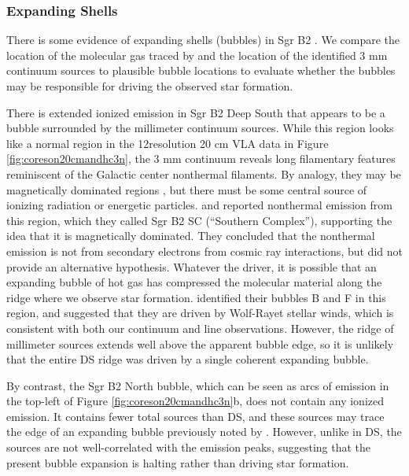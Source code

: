 \documentclass[twocolumn]{aastex61}
\begin{document}
\subsubsection{Expanding Shells}
\label{sec:expandingshells}
There is some evidence of expanding shells (bubbles) in Sgr B2
\citep{de-Vicente1997a,Martin-Pintado1999a}.  We compare the location of the
molecular gas traced by \cyanoacetylene and the location of the identified 3 mm
continuum sources to plausible bubble locations to evaluate whether the bubbles
may be responsible for driving the observed star formation.


There is extended ionized emission in Sgr B2 Deep South that appears to be a
bubble surrounded by the millimeter continuum sources.  While this region looks
like a normal \hii region in the 12\arcsec resolution 20 cm
VLA data in Figure \ref{fig:coreson20cmandhc3n}, the 3 mm continuum reveals long
filamentary features reminiscent of the Galactic center nonthermal filaments.  By
analogy, they may be magnetically dominated regions
\citep[e.g.,][]{LaRosa2004a}, but there must be some
central source of ionizing radiation or energetic particles.
\citet{Jones2011a} and \citet{Protheroe2008a} reported nonthermal
emission from this region, which they called Sgr B2 SC (``Southern Complex''),
supporting the idea that it is magnetically dominated. 
They concluded that the nonthermal emission is not from secondary electrons
from cosmic ray interactions, but did not provide an alternative hypothesis.
Whatever the
driver, it is possible that an expanding bubble of hot gas has compressed the
molecular material along the ridge where we observe star formation.
\citet{Martin-Pintado1999a} identified their bubbles B and F in this region,
and suggested that they are driven by Wolf-Rayet stellar winds, which is
consistent with both our continuum and line observations.  However, the ridge
of millimeter sources extends well above the apparent bubble edge, so it is
unlikely that the entire DS ridge was driven by a single coherent expanding
bubble.

By contrast, the Sgr B2 North bubble, which can be seen as arcs of
\cyanoacetylene emission in the top-left of Figure
\ref{fig:coreson20cmandhc3n}b, does not contain any ionized emission.  It
contains fewer total sources than DS, and these sources may trace the edge of
an expanding bubble previously noted by \citet{de-Vicente1997a}.  However,
unlike in DS, the sources are not well-correlated with the \cyanoacetylene
emission peaks, suggesting that the present bubble expansion is halting rather
than driving star formation.
\end{document}

